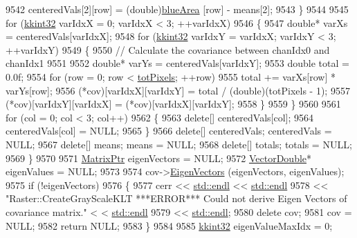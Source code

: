 \begin{DoxyCode}
9542       centeredVals[2][row] = (double)\hyperlink{class_k_k_b_1_1_raster_af7996dfe61613e5ecf91454175bfe3f1}{blueArea}  [row] - means[2];
9543     \}
9544  
9545     \textcolor{keywordflow}{for}  (\hyperlink{namespace_k_k_b_a8fa4952cc84fda1de4bec1fbdd8d5b1b}{kkint32} varIdxX = 0;  varIdxX < 3;  ++varIdxX)
9546     \{
9547       \textcolor{keywordtype}{double}*  varXs = centeredVals[varIdxX];
9548       \textcolor{keywordflow}{for}  (\hyperlink{namespace_k_k_b_a8fa4952cc84fda1de4bec1fbdd8d5b1b}{kkint32} varIdxY = varIdxX;  varIdxY < 3;  ++varIdxY)
9549       \{
9550         \textcolor{comment}{// Calculate the covariance between chanIdx0 and chanIdx1}
9551 
9552         \textcolor{keywordtype}{double}*  varYs = centeredVals[varIdxY];
9553         \textcolor{keywordtype}{double} total = 0.0f;
9554         \textcolor{keywordflow}{for}  (row = 0;  row < \hyperlink{class_k_k_b_1_1_raster_a9b08c4a0ca0a35435a478599635f1dc0}{totPixels};  ++row)
9555           total += varXs[row] * varYs[row];
9556         (*cov)[varIdxX][varIdxY] = total / (double)(totPixels - 1);
9557         (*cov)[varIdxY][varIdxX]  = (*cov)[varIdxX][varIdxY];
9558       \}
9559     \}
9560 
9561     \textcolor{keywordflow}{for}  (col = 0;  col < 3;  col++)
9562     \{
9563       \textcolor{keyword}{delete}[]  centeredVals[col];
9564       centeredVals[col] = NULL;
9565     \}
9566     \textcolor{keyword}{delete}[]  centeredVals;   centeredVals = NULL;
9567     \textcolor{keyword}{delete}[]  means;          means  = NULL;
9568     \textcolor{keyword}{delete}[]  totals;         totals = NULL;
9569   \}
9570  
9571   \hyperlink{class_k_k_b_1_1_matrix}{MatrixPtr}      eigenVectors = NULL;
9572   \hyperlink{namespace_k_k_b_a5906c207479607e5f450434095914a41}{VectorDouble}*  eigenValues  = NULL;
9573 
9574   cov->\hyperlink{class_k_k_b_1_1_matrix_a1d9e7525cebca179d2cefa3c68beb523}{EigenVectors} (eigenVectors, eigenValues);
9575   \textcolor{keywordflow}{if}  (!eigenVectors)
9576   \{
9577     cerr << \hyperlink{namespace_k_k_b_ad1f50f65af6adc8fa9e6f62d007818a8}{std::endl} << \hyperlink{namespace_k_k_b_ad1f50f65af6adc8fa9e6f62d007818a8}{std::endl} 
9578       << \textcolor{stringliteral}{"Raster::CreateGrayScaleKLT  ***ERROR***   Could not derive Eigen Vectors of covariance matrix."} <
      < \hyperlink{namespace_k_k_b_ad1f50f65af6adc8fa9e6f62d007818a8}{std::endl}
9579       << \hyperlink{namespace_k_k_b_ad1f50f65af6adc8fa9e6f62d007818a8}{std::endl};
9580     \textcolor{keyword}{delete}  cov;
9581     cov = NULL;
9582     \textcolor{keywordflow}{return} NULL;
9583   \}
9584 
9585   \hyperlink{namespace_k_k_b_a8fa4952cc84fda1de4bec1fbdd8d5b1b}{kkint32} eigenValueMaxIdx = 0;

\end{DoxyCode}

